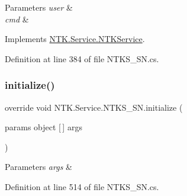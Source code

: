 \begin{DoxyParams}{Parameters}
{\em user} & \\
\hline
{\em cmd} & \\
\hline
\end{DoxyParams}


Implements \mbox{\hyperlink{class_n_t_k_1_1_service_1_1_n_t_k_service_a5f591a8d31f2e2b01fc47a17a4102574}{N\+T\+K.\+Service.\+N\+T\+K\+Service}}.



Definition at line 384 of file N\+T\+K\+S\+\_\+\+S\+N.\+cs.

\mbox{\label{class_n_t_k_1_1_service_1_1_n_t_k_s___s_n_aeebcac59f0a3746bbf307c3d4cb98d76}} 
\subsubsection{\texorpdfstring{initialize()}{initialize()}}
{\footnotesize\ttfamily override void N\+T\+K.\+Service.\+N\+T\+K\+S\+\_\+\+S\+N.\+initialize (\begin{DoxyParamCaption}\item[{params object \mbox{[}$\,$\mbox{]}}]{args }\end{DoxyParamCaption})}






\begin{DoxyParams}{Parameters}
{\em args} & \\
\hline
\end{DoxyParams}


Definition at line 514 of file N\+T\+K\+S\+\_\+\+S\+N.\+cs.

\mbox{\label{class_n_t_k_1_1_service_1_1_n_t_k_s___s_n_ad8969d9732dad1acb4db9b0a80d4c7be}} 
